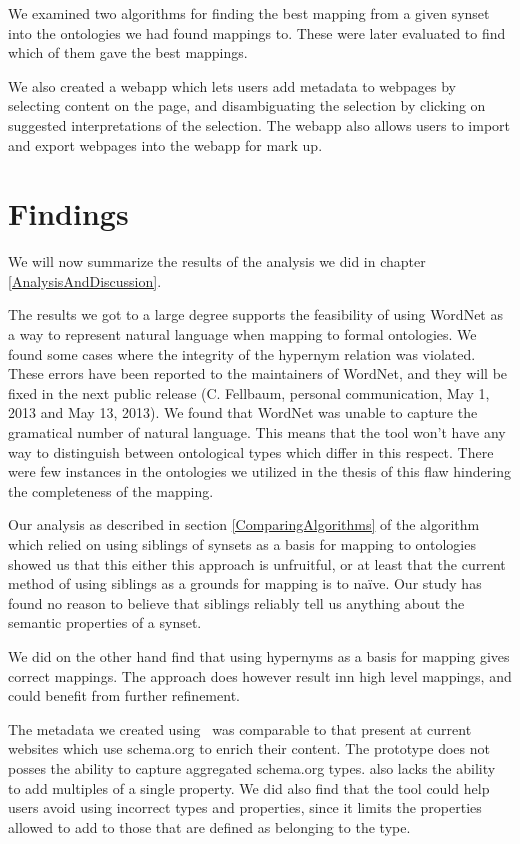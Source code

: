 We examined two algorithms for finding the best mapping from a given synset into the ontologies we had found mappings to.
These were later evaluated to find which of them gave the best mappings.

We also created a webapp which lets users add metadata to webpages by selecting content on the page,
and disambiguating the selection by clicking on suggested interpretations of the selection.
The webapp also allows users to import and export webpages into the webapp for mark up.

\section{Findings}
We will now summarize the results of the analysis we did in chapter \ref{AnalysisAndDiscussion}.

The results we got to a large degree supports the feasibility of using WordNet as a way to represent natural language
when mapping to formal ontologies.
We found some cases where the integrity of the hypernym relation was violated.
These errors have been reported to the maintainers of WordNet, and they will be fixed in the next public  release (C. Fellbaum, personal communication, May 1, 2013 and May 13, 2013).
We found that WordNet was unable to capture the gramatical number of natural language.
This means that the tool won't have any way to distinguish between ontological types which differ in this respect.
There were few instances in the ontologies we utilized in the thesis of this flaw hindering the completeness of the mapping.

Our analysis as described in section \ref{ComparingAlgorithms} of the algorithm which relied on
using siblings of synsets as a basis for mapping to ontologies showed us that this either this approach is unfruitful,
or at least that the current method of using siblings as a grounds for mapping is to naïve.
Our study has found no reason to believe that siblings reliably tell us anything about the semantic properties of a synset.

We did on the other hand find that using hypernyms as a basis for mapping gives correct mappings.
The approach does however result inn high level mappings, and could benefit from further refinement.

The metadata we created using \theartefact\ was comparable to that present at current websites which use schema.org to
enrich their content.
The prototype does not posses the ability to capture aggregated schema.org types.
\Theartefact also lacks the ability to add multiples of a single property.
We did also find that the tool could help users avoid using incorrect types and properties,
since it limits the properties allowed to add to those that are defined as belonging to the type.

